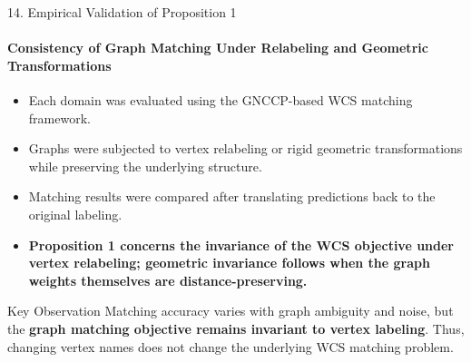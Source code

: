 \documentclass[aspectratio=169, 11pt]{beamer}
\begin{document}
\begin{frame}{14. Empirical Validation of Proposition 1}
\framesubtitle{Consistency of Graph Matching Under Relabeling and Geometric Transformations}

\vspace{0.3em}

\begin{itemize}
\setlength\itemsep{0.35em}

\item Each domain was evaluated using the GNCCP-based WCS matching framework.

\item Graphs were subjected to vertex relabeling or
rigid geometric transformations while preserving the underlying structure.

\item Matching results were compared after translating predictions
back to the original labeling.

\item \textbf{Proposition 1 concerns the invariance of the WCS objective
under vertex relabeling; geometric invariance follows when the graph
weights themselves are distance-preserving.}

\end{itemize}

\vspace{0.5em}

\centering

\renewcommand{\arraystretch}{1.25}


\vspace{0.7em}

\begin{block}{Key Observation}
\small
Matching accuracy varies with graph ambiguity and noise,
but the \textbf{graph matching objective remains invariant to vertex
labeling}. Thus, changing vertex names does not change the underlying
WCS matching problem.
\end{block}

\end{frame}
\end{document}
